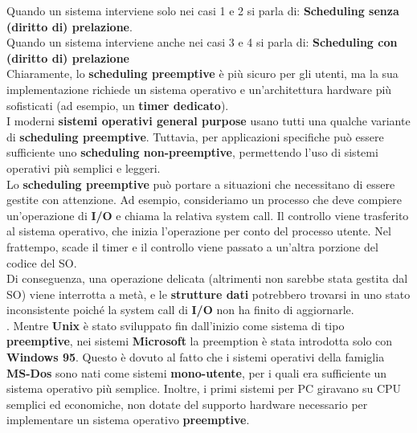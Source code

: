 Quando un sistema interviene solo nei casi 1 e 2 si parla di: \textbf{Scheduling senza (diritto di) prelazione}.\\
Quando un sistema interviene anche nei casi 3 e 4 si parla di: \textbf{Scheduling con (diritto di) prelazione}\\
Chiaramente, lo {\textbf{scheduling preemptive}} è più sicuro per gli utenti, ma la sua implementazione richiede un {sistema operativo} e un’{architettura hardware} più sofisticati (ad esempio, un \textbf{timer dedicato}).\\
I moderni \textbf{sistemi operativi general purpose} usano tutti una qualche variante di {\textbf{scheduling preemptive}}. Tuttavia, per applicazioni specifiche può essere sufficiente uno {\textbf{scheduling non-preemptive}}, permettendo l'uso di sistemi operativi più semplici e leggeri.\\
Lo {\textbf{scheduling preemptive}} può portare a situazioni che necessitano di essere gestite con attenzione. Ad esempio, consideriamo un processo che deve compiere un’operazione di {\textbf{I/O}} e chiama la relativa {system call}. Il controllo viene trasferito al {sistema operativo}, che inizia l’operazione per conto del processo utente. Nel frattempo, scade il timer e il controllo viene passato a un'altra porzione del codice del {SO}.\\
Di conseguenza, una operazione delicata (altrimenti non sarebbe stata gestita dal {SO}) viene interrotta a metà, e le {\textbf{strutture dati}} potrebbero trovarsi in uno stato inconsistente poiché la system call di {\textbf{I/O}} non ha finito di aggiornarle.\\
.
Mentre \textbf{Unix} è stato sviluppato fin dall’inizio come sistema di tipo {\textbf{preemptive}}, nei sistemi \textbf{Microsoft} la preemption è stata introdotta solo con \textbf{Windows 95}. Questo è dovuto al fatto che i sistemi operativi della famiglia \textbf{MS-Dos} sono nati come sistemi {\textbf{mono-utente}}, per i quali era sufficiente un sistema operativo più semplice. Inoltre, i primi sistemi per PC giravano su {CPU} semplici ed economiche, non dotate del supporto hardware necessario per implementare un sistema operativo {\textbf{preemptive}}.\\

